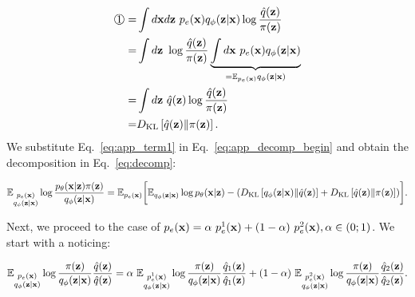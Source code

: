 \begin{equation}
\label{eq:app_term1}
    \begin{aligned}
     \raisebox{.5pt}{\textcircled{\raisebox{-.9pt} {\text{\ttfamily \normalfont 1}}}} 
     = &\int d\rvx d\rvz~p_{e}(\rvx)q_{\phi}(\rvz|\rvx) \log\dfrac{\hat{q}(\rvz)}{\pi(\rvz)} \\
     = &\int d\rvz~ \log\dfrac{\hat{q}(\rvz)}{\pi(\rvz)}\underbrace{\int d\rvx~p_{e}(\rvx)q_{\phi}(\rvz|\rvx)}_{=\E_{p_{e}(\rvx)}q_{\phi}(\rvz|\rvx)} \\
     = & \int d\rvz~\hat{q}(\rvz)\log\dfrac{\hat{q}(\rvz)}{\pi(\rvz)} \\
     = & \KL{\hat{q}(\rvz)}{\pi(\rvz)}.
    \end{aligned}
\end{equation}
We substitute Eq.~\ref{eq:app_term1} in Eq.~\ref{eq:app_decomp_begin}
and obtain the decomposition in Eq.~\ref{eq:decomp}:
\begin{fullwidth}
\begin{equation}
\begin{aligned}
     \mathbb{E}_{\substack{p_{e}({\mathbf{x}})\\q_{\phi}({\mathbf{z}}|{\mathbf{x}})}}\log \dfrac{p_{\theta}({\mathbf{x}}|{\mathbf{z}})\pi({\mathbf{z}})}{q_{\phi}({\mathbf{z}}|{\mathbf{x}})} 
    =  \mathbb{E}_{p_{e}({\mathbf{x}})}\biggl[\mathbb{E}_{q_{\phi}({\mathbf{z}}|{\mathbf{x}})}\log p_{\theta}({\mathbf{x}}|{\mathbf{z}}) 
       -  \left(D_{\mathrm{KL}}\left[q_{\phi}({\mathbf{z}}|{\mathbf{x}})\|\hat{q}({\mathbf{z}})\right]+ D_{\mathrm{KL}}\left[\hat{q}({\mathbf{z}})\|\pi({\mathbf{z}})\right]\right)\biggr].
    \end{aligned}
\end{equation}
\end{fullwidth}
	
Next, we proceed to the case of $p_{e}({\mathbf{x}}) = \alpha~p_{e}^{1}({\mathbf{x}}) + (1-\alpha)~p_{e}^{2}({\mathbf{x}}), \alpha\in(0;1)$. We start with a noticing:
\begin{fullwidth}
\begin{equation}
    \begin{aligned}
    \mathbb{E}_{\substack{p_{e}({\mathbf{x}})\\q_{\phi}({\mathbf{z}}|{\mathbf{x}})}}\log\dfrac{\pi({\mathbf{z}})}{q_{\phi}({\mathbf{z}}|{\mathbf{x}})}\dfrac{\hat{q}({\mathbf{z}})}{\hat{q}({\mathbf{z}})}  
   =  \alpha~\mathbb{E}_{\substack{p^{1}_{e}({\mathbf{x}})\\q_{\phi}({\mathbf{z}}|{\mathbf{x}})}}\log\dfrac{\pi({\mathbf{z}})}{q_{\phi}({\mathbf{z}}|{\mathbf{x}})}\dfrac{\hat{q}_{1}({\mathbf{z}})}{\hat{q}_{1}({\mathbf{z}})} + (1-\alpha) ~\mathbb{E}_{\substack{p^{2}_{e}({\mathbf{x}})\\q_{\phi}({\mathbf{z}}|{\mathbf{x}})}}\log\dfrac{\pi({\mathbf{z}})}{q_{\phi}({\mathbf{z}}|{\mathbf{x}})}\dfrac{\hat{q}_{2}({\mathbf{z}})}{\hat{q}_{2}({\mathbf{z}})}.
    \end{aligned}
\end{equation}
\end{fullwidth}
	
